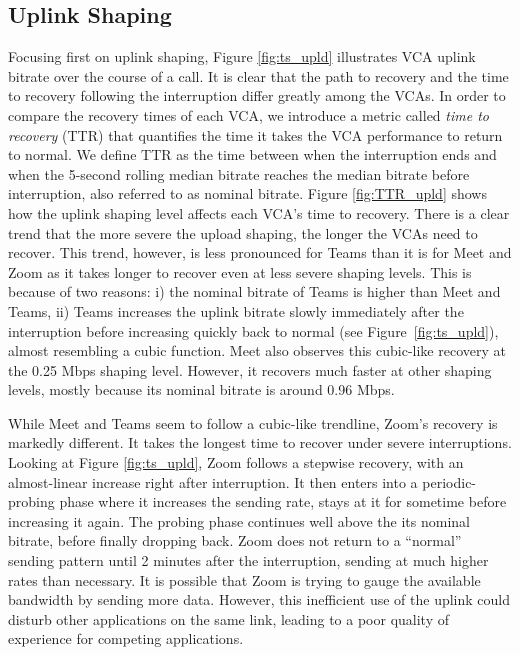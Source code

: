 \subsection{Uplink Shaping}
Focusing first on uplink shaping, Figure \ref{fig:ts_upld} illustrates VCA uplink bitrate over the course of a call. It is clear that the path to recovery and the time to recovery following the interruption differ greatly among the VCAs. In order to compare the recovery times of each VCA, we introduce a metric called \textit{time to recovery} (TTR) that quantifies the time it takes the VCA performance to return to normal. We define TTR as the time between when the interruption ends and when the 5-second rolling median bitrate reaches the median bitrate before interruption, also referred to as nominal bitrate. %
Figure \ref{fig:TTR_upld} shows how the uplink shaping level affects each VCA's time to recovery. There is a clear trend that the more severe the upload shaping, the longer the VCAs need to recover. This trend, however, is less pronounced for Teams than it is for Meet and Zoom as it takes longer to recover even at less severe shaping levels. This is because of two reasons: i) the nominal bitrate of Teams is higher than Meet and Teams, ii)  Teams increases the uplink bitrate slowly immediately after the interruption before increasing quickly back to normal (see  Figure~\ref{fig:ts_upld}), almost resembling a cubic function. Meet also observes this cubic-like recovery at the 0.25 Mbps shaping level. However, it recovers much faster at other shaping levels, mostly because its nominal bitrate is around 0.96 Mbps. 

While Meet and Teams seem to follow a cubic-like trendline, Zoom's recovery is markedly different. It takes the longest time to recover under severe interruptions. Looking at Figure \ref{fig:ts_upld}, Zoom follows a stepwise recovery, with an almost-linear increase right after interruption. It then enters into a periodic-probing phase where it increases the sending rate, stays at it for sometime before increasing it again. The probing phase continues well above the its nominal bitrate, before finally dropping back. Zoom does not return to a ``normal'' sending pattern until 2 minutes after the interruption, sending at much higher rates than necessary. It is possible that Zoom is trying to gauge the available bandwidth by sending more data. However, this inefficient use of the uplink could disturb other applications on the same link, leading to a poor quality of experience for competing applications. 

